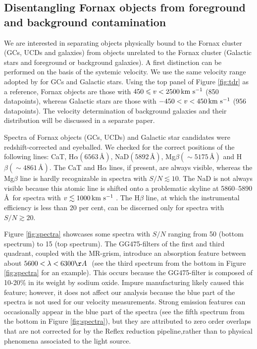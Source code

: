 \documentclass[useAMS,usenatbib]{mn2e}
\newcommand{\kms}{\mbox{\,km~s$^{-1}$}}
\begin{document}
\subsection{Disentangling Fornax objects from foreground and background contamination}

We are interested in separating objects physically bound to the Fornax cluster (GCs, UCDs and galaxies) from objects unrelated to the Fornax cluster (Galactic stars and foreground or background galaxies). A first distinction can be performed on the basis of the systemic velocity. We use the same velocity range adopted by \cite{Schuberth} for GCs and Galactic stars.
Using the top panel of Figure \ref{fig:tdr} as a reference, Fornax objects are those with $450 \le v <2500 \kms$ (850 datapoints), whereas Galactic stars are those with $-450<v<450 \kms$ (956 datapoints). The velocity determination of background galaxies and their distribution will be discussed in a separate paper.

Spectra of Fornax objects (GCs, UCDs) and Galactic star candidates were redshift-corrected and eyeballed. We checked for the correct positions of the following lines: CaT, H$\alpha (6563 \, \mbox{\AA})$, NaD$(5892 \, \mbox{\AA})$, Mg$\beta (\sim 5175 \, \mbox{\AA})$ and H$\beta (\sim 4861\, \mbox{\AA})$. The CaT and H$\alpha$ lines, if present, are always visible, whereas the Mg$\beta$ line is hardly recognizable in spectra with $S/N \lesssim 10$. The NaD is not always visible because this atomic line is shifted onto a problematic skyline at 5860--5890 \AA\ for spectra with $v \lesssim 1000\kms$ . The H$\beta$ line, at which the instrumental efficiency is less than $20$ per cent, can be discerned only for spectra with $S/N \gtrsim 20 $.

Figure \ref{fig:spectra} showcases some spectra with $S/N$ ranging from 50 (bottom spectrum) to 15 (top spectrum). 
The GG475-filters of the first and third quadrant, coupled with the MR-grism, introduce an absorption feature between about $5600 < \lambda < 6300 \AA\ $ (see the third spectrum from the bottom in Figure \ref{fig:spectra} for an example). This occurs because the GG475-filter is composed of 10-20\% in its weight by sodium oxide. Impure manufacturing likely caused this feature; however, it does not affect our analysis because the blue part of the spectra is not used for our velocity measurements. Strong emission features can occasionally appear in the blue part of the spectra (see the fifth spectrum from the bottom in Figure \ref{fig:spectra}), but they are attributed to zero order overlaps that are not corrected for by the Reflex reduction pipeline,rather than to physical phenomena associated to the light source. 
\end{document}
